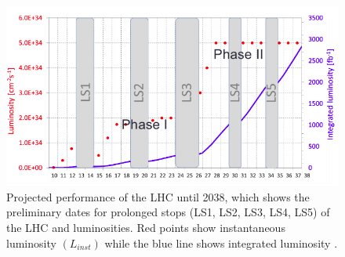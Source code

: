 \begin{figure}[H]
  \centering
  \includegraphics[width=0.7 \columnwidth]{./lumi_projection.png}
  \caption{ \onehalfspacing Projected performance of the LHC until 2038, which shows the preliminary dates for prolonged stops (LS1, LS2, LS3, LS4, LS5) of the LHC and luminosities. Red points show instantaneous luminosity $(L_{inst})$ while the blue line shows integrated luminosity \cite{collaborations2019report}.}
  \label{fig:LHCPlans}
\end{figure}


\clearpage\newpage







